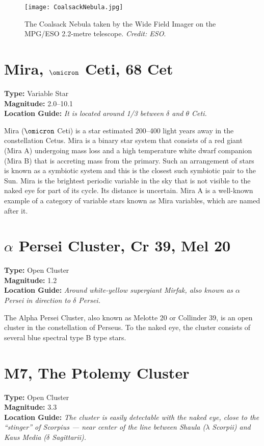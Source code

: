 \begin{figure}[ht]
\centering
\texttt{[image: CoalsackNebula.jpg]}
\caption{The Coalsack Nebula taken by the Wide Field Imager on the MPG/ESO 2.2-metre telescope. \emph{Credit: ESO}.}
\label{fig:CoalsackNebula}
\end{figure}

\section{Mira, \texorpdfstring{$\omicron$}{omicron} Ceti, 68 Cet}
\textbf{Type:} Variable Star \\
\textbf{Magnitude:} 2.0--10.1 \\ 
\textbf{Location Guide:} \textit{It is located around 1/3 between $\delta$ and $\theta$ Ceti.}

Mira ($\omicron$ Ceti) is a star estimated 200--400 light years away in the constellation Cetus. Mira is a binary star system that consists of a red giant (Mira A) undergoing mass loss and a high temperature white dwarf companion (Mira B) that is accreting mass from the primary. Such an arrangement of stars is known as a symbiotic system and this is the closest such symbiotic pair to the Sun. Mira is the brightest periodic variable in the sky that is not visible to the naked eye for part of its cycle. Its distance is uncertain. Mira A is a well-known example of a category of variable stars known as Mira variables, which are named after it.

\section{\texorpdfstring{$\alpha$}{alpha} Persei Cluster, Cr 39, Mel 20}
\textbf{Type:} Open Cluster \\
\textbf{Magnitude:} 1.2 \\ 
\textbf{Location Guide:} \textit{Around white-yellow supergiant Mirfak, also known as $\alpha$ Persei in direction to $\delta$ Persei.}

The Alpha Persei Cluster, also known as Melotte 20 or Collinder 39, is an open cluster in the constellation of Perseus. To the naked eye, the cluster consists of several blue spectral type B type stars.

\section{M7, The Ptolemy Cluster}
\textbf{Type:} Open Cluster \\
\textbf{Magnitude:} 3.3 \\ 
\textbf{Location Guide:} \textit{The cluster is easily detectable with the naked eye, close to the ``stinger'' of Scorpius --- near center of the line between Shaula ($\lambda$ Scorpii) and Kaus Media ($\delta$ Sagittarii).}

